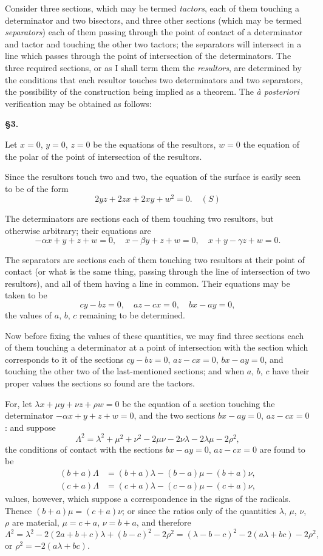 \documentclass[11pt]{article}
\begin{document}
Consider three sections, which may be termed \textit{tactors}, each of them touching a determinator and two bisectors, and three other sections (which may be termed \textit{separators}) each of them passing through the point of contact of a determinator and tactor and touching the other two tactors; the separators will intersect in a line which passes through the point of intersection of the determinators. The three required sections, or as I shall term them the \textit{resultors}, are determined by the conditions that each resultor touches two determinators and two separators, the possibility of the construction being implied as a theorem. The \textit{\`a posteriori} verification may be obtained as follows:

\noindent\textbf{\S 3.}

Let $x=0$, $y=0$, $z=0$ be the equations of the resultors, $w=0$ the equation of the polar of the point of intersection of the resultors.

Since the resultors touch two and two, the equation of the surface is easily seen to be of the form
\[
2yz + 2zx + 2xy + w^2 = 0. \quad (S)
\]

The determinators are sections each of them touching two resultors, but otherwise arbitrary; their equations are
\[
-\alpha x + y + z + w = 0, \quad x - \beta y + z + w = 0, \quad x + y - \gamma z + w = 0.
\]

The separators are sections each of them touching two resultors at their point of contact (or what is the same thing, passing through the line of intersection of two resultors), and all of them having a line in common. Their equations may be taken to be
\[
cy - bz = 0, \quad az - cx = 0, \quad bx - ay = 0,
\]
the values of $a$, $b$, $c$ remaining to be determined.

Now before fixing the values of these quantities, we may find three sections each of them touching a determinator at a point of intersection with the section which corresponds to it of the sections $cy-bz=0$, $az-cx=0$, $bx-ay=0$, and touching the other two of the last-mentioned sections; and when $a$, $b$, $c$ have their proper values the sections so found are the tactors.

\newpage
\setcounter{page}{60}

For, let $\lambda x + \mu y + \nu z + \rho w = 0$ be the equation of a section touching the determinator $-\alpha x + y + z + w = 0$, and the two sections $bx-ay=0$, $az-cx=0$: and suppose
\[
\Lambda^2 = \lambda^2 + \mu^2 + \nu^2 - 2\mu\nu - 2\nu\lambda - 2\lambda\mu - 2\rho^2,
\]
the conditions of contact with the sections $bx-ay=0$, $az-cx=0$ are found to be
\begin{align*}
(b+a)\Lambda &= (b+a)\lambda - (b-a)\mu - (b+a)\nu,\\
(c+a)\Lambda &= (c+a)\lambda - (c-a)\mu - (c+a)\nu,
\end{align*}
values, however, which suppose a correspondence in the signs of the radicals. Thence $(b+a)\mu = (c+a)\nu$; or since the ratios only of the quantities $\lambda$, $\mu$, $\nu$, $\rho$ are material, $\mu = c+a$, $\nu = b+a$, and therefore
\[
\Lambda^2 = \lambda^2 - 2(2a+b+c)\lambda + (b-c)^2 - 2\rho^2 = (\lambda - b - c)^2 - 2(a\lambda+bc) - 2\rho^2,
\]
or $\rho^2 = -2(a\lambda+bc)$.
\end{document}

